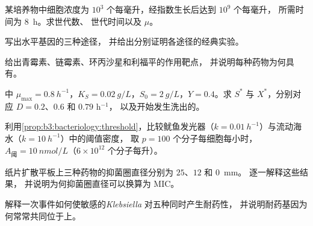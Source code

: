 \begin{exercise}[$\star$]\label{exo:b3:bacteriology:2}
某培养物中细胞浓度为 $10^{3}$ 个每毫升，经指数生长后达到 $10^{9}$ 个每毫升，
所需时间为 \qty{8}{h}。求世代数、
世代时间以及 $\mu$。
\end{exercise}

\begin{exercise}[$\star$]\label{exo:b3:bacteriology:3}
写出水平基因的三种途径，
并给出分别证明各途径的经典实验。
\end{exercise}

\begin{exercise}[$\star$]\label{exo:b3:bacteriology:4}
给出青霉素、链霉素、环丙沙星和利福平的作用靶点，
并说明每种药物为何具有。
\end{exercise}

\begin{exercise}[$\star\star$]\label{exo:b3:bacteriology:5}
中 $\mu_{\max} = \qty{0.8}{h^{-1}}$，$K_{S} =
\qty{0.02}{g/L}$，$S_{0} = \qty{2}{g/L}$，$Y = 0.4$。求 $S^{*}$ 与
$X^{*}$，分别对应 $D = 0.2$、$0.6$ 和 $0.79$ h$^{-1}$，
以及开始发生洗出的。
\end{exercise}

\begin{exercise}[$\star\star$]\label{exo:b3:bacteriology:6}
利用\cref{prop:b3:bacteriology:threshold}，比较鱿鱼发光器（$k =
\qty{0.01}{h^{-1}}$）与流动海水（$k = \qty{10}{h^{-1}}$）中的阈值密度，
取 $p = 100$ 个分子每细胞每小时，
$A_{\text{阈}} =
\qty{10}{nmol/L}$（$6\times 10^{12}$ 个分子每升）。
\end{exercise}

\begin{exercise}[$\star\star$]\label{exo:b3:bacteriology:7}
纸片扩散平板上三种药物的抑菌圈直径分别为 $25$、$12$ 和 \qty{0}{mm}。
逐一解释这些结果，
并说明为何抑菌圈直径可以换算为 MIC。
\end{exercise}

\begin{exercise}[$\star\star$]\label{exo:b3:bacteriology:8}
解释一次事件如何使敏感的\emph{Klebsiella}
对五种同时产生耐药性，
并说明耐药基因为何常常共同位于上。
\end{exercise}

